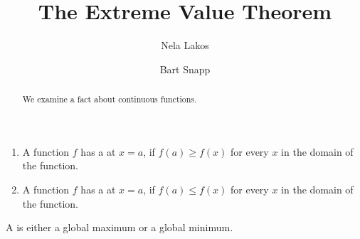 \documentclass{ximera}
\author{Nela Lakos \and Bart Snapp}
\title[Dig-In:]{The Extreme Value Theorem}
\begin{document}
\begin{abstract}
  We examine a fact about continuous functions.
\end{abstract}
\maketitle

\begin{definition}\hfil{}
\begin{enumerate}
\item A function $f$ has a  at $x=a$, if $f(a)\ge
  f(x)$ for every $x$ in the domain of the function.
\item A function $f$ has a  at $x=a$, if $f(a)\le
  f(x)$ for every $x$ in the domain of the function.
\end{enumerate} 
A  is either a
global maximum or a global minimum.
\end{definition}
\end{document}
